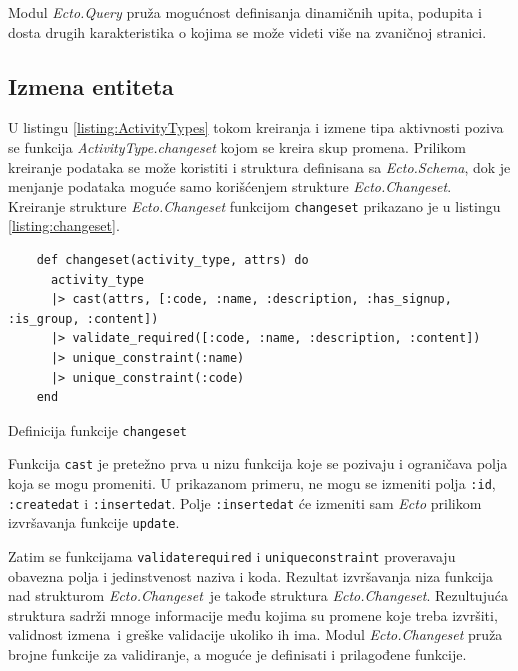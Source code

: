 \documentclass[12pt,oneside]{memoir}
\begin{document}
Modul \emph{Ecto.Query} pruža mogućnost definisanja dinamičnih upita, podupita i dosta drugih karakteristika o kojima se može videti više na zvaničnoj stranici.

\subsection{Izmena entiteta}
U listingu \ref{listing:ActivityTypes} tokom kreiranja i izmene tipa aktivnosti poziva se
funkcija \emph{ActivityType.changeset} kojom se kreira skup promena. Prilikom kreiranje
podataka se može koristiti i struktura definisana sa \emph{Ecto.Schema}, dok je 
menjanje podataka moguće samo korišćenjem strukture \emph{Ecto.Changeset}.
Kreiranje strukture \emph{Ecto.Changeset} funkcijom \texttt{changeset} 
prikazano je u listingu \ref{listing:changeset}. 
\begin{listing}[!h]
\begin{verbatim}
    def changeset(activity_type, attrs) do
      activity_type
      |> cast(attrs, [:code, :name, :description, :has_signup, :is_group, :content])
      |> validate_required([:code, :name, :description, :content])
      |> unique_constraint(:name)
      |> unique_constraint(:code)
    end
\end{verbatim}
\caption{Definicija funkcije \texttt{changeset}}
\label{listing:changeset}
\end{listing}

Funkcija \texttt{cast} je pretežno prva u nizu funkcija koje se pozivaju i ograničava polja koja se mogu promeniti.
U prikazanom primeru, ne mogu se izmeniti polja \texttt{:id}, \texttt{:created{\textunderscore}at} i
\texttt{:inserted{\textunderscore}at}. Polje \texttt{:inserted{\textunderscore}at} će izmeniti sam \emph{Ecto}
prilikom izvršavanja funkcije \texttt{update}.

Zatim se funkcijama \texttt{validate{\textunderscore}required} i \texttt{unique{\textunderscore}constraint} 
proveravaju obavezna polja i jedinstvenost naziva i koda. Rezultat izvršavanja niza funkcija nad strukturom
\emph{Ecto.Changeset} je takođe struktura \emph{Ecto.Changeset}. Rezultujuća struktura sadrži mnoge informacije
među kojima su promene koje treba izvršiti, validnost izmena i greške validacije ukoliko ih ima.
Modul \emph{Ecto.Changeset} pruža brojne funkcije za validiranje, a moguće je definisati i prilagođene funkcije.
\end{document}
